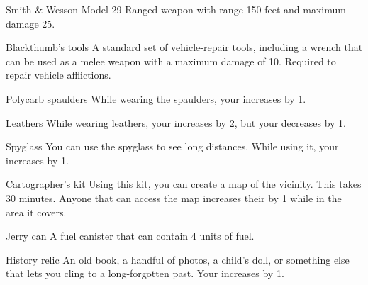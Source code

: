 \begin{describe}{Smith \& Wesson Model 29}
  Ranged weapon with range 150 feet and maximum damage 25.
\end{describe}

\begin{describe}{Blackthumb's tools}
  A standard set of vehicle-repair tools, including a wrench that can be used as a melee weapon with a maximum damage of 10. Required to repair vehicle afflictions.
\end{describe}

\begin{describe}{Polycarb spaulders}
  While wearing the spaulders, your  increases by 1.
\end{describe}

\begin{describe}{Leathers}
  While wearing leathers, your  increases by 2, but your  decreases by 1.
\end{describe}

\begin{describe}{Spyglass}
  You can use the spyglass to see long distances. While using it, your  increases by 1.
\end{describe}

\begin{describe}{Cartographer's kit}
  Using this kit, you can create a map of the vicinity. This takes 30 minutes. Anyone that can access the map increases their  by 1 while in the area it covers.
\end{describe}

\begin{describe}{Jerry can}
  A fuel canister that can contain 4 units of fuel.
\end{describe}

\begin{describe}{History relic}
  An old book, a handful of photos, a child's doll, or something else that lets you cling to a long-forgotten past. Your  increases by 1.
\end{describe}
